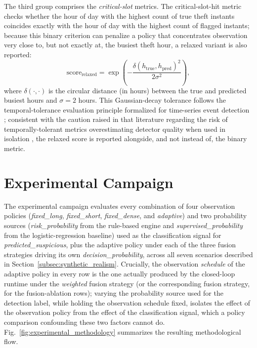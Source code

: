 \documentclass{ieeeaccess}
\begin{document}
The third group comprises the \textit{critical-slot} metrics. The critical-slot-hit metric checks whether the hour of day with the highest count of true theft instants coincides exactly with the hour of day with the highest count of flagged instants; because this binary criterion can penalize a policy that concentrates observation very close to, but not exactly at, the busiest theft hour, a relaxed variant is also reported:
\begin{equation}
\text{score}_{\text{relaxed}} = \exp\!\left(-\frac{\delta(h_{\text{true}}, h_{\text{pred}})^2}{2\sigma^2}\right),
\label{eq:relaxed_critical_slot}
\end{equation}
where $\delta(\cdot,\cdot)$ is the circular distance (in hours) between the true and predicted busiest hours and $\sigma = 2$ hours. This Gaussian-decay tolerance follows the temporal-tolerance evaluation principle formalized for time-series event detection \cite{b36,b37}; consistent with the caution raised in that literature regarding the risk of temporally-tolerant metrics overestimating detector quality when used in isolation \cite{b37}, the relaxed score is reported alongside, and not instead of, the binary metric.

\section{Experimental Campaign}
\label{sec:experimental_campaign}
The experimental campaign evaluates every combination of four observation policies (\textit{fixed\_long}, \textit{fixed\_short}, \textit{fixed\_dense}, and \textit{adaptive}) and two probability sources (\textit{risk\_probability} from the rule-based engine and \textit{supervised\_probability} from the logistic-regression baseline) used as the classification signal for \textit{predicted\_suspicious}, plus the adaptive policy under each of the three fusion strategies driving its own \textit{decision\_probability}, across all seven scenarios described in Section~\ref{subsec:synthetic_realism}. Crucially, the observation \emph{schedule} of the adaptive policy in every row is the one actually produced by the closed-loop runtime under the \textit{weighted} fusion strategy (or the corresponding fusion strategy, for the fusion-ablation rows); varying the probability source used for the detection label, while holding the observation schedule fixed, isolates the effect of the observation policy from the effect of the classification signal, which a policy comparison confounding these two factors cannot do. Fig.~\ref{fig:experimental_methodology} summarizes the resulting methodological flow.
\end{document}
